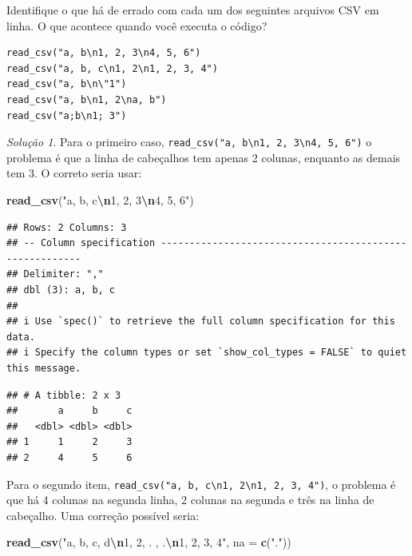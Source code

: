 \documentclass[
]{latex/krantz}
\newenvironment{Shaded}{\begin{snugshade}}{\end{snugshade}}
\newcommand{\AttributeTok}[1]{\textcolor[rgb]{0.13,0.29,0.53}{#1}}
\newcommand{\FunctionTok}[1]{\textcolor[rgb]{0.13,0.29,0.53}{\textbf{#1}}}
\newcommand{\NormalTok}[1]{#1}
\newcommand{\SpecialCharTok}[1]{\textcolor[rgb]{0.81,0.36,0.00}{\textbf{#1}}}
\newcommand{\StringTok}[1]{\textcolor[rgb]{0.31,0.60,0.02}{#1}}
\theoremstyle{definition}
\theoremstyle{definition}
\theoremstyle{definition}
\theoremstyle{definition}
\theoremstyle{remark}
\newtheorem*{solution}{Solução}
\begin{document}
Identifique o que há de errado com cada um dos seguintes arquivos CSV em linha. O que acontece quando você executa o código?

\begin{verbatim}
read_csv("a, b\n1, 2, 3\n4, 5, 6")
read_csv("a, b, c\n1, 2\n1, 2, 3, 4")
read_csv("a, b\n\"1")
read_csv("a, b\n1, 2\na, b")
read_csv("a;b\n1; 3")
\end{verbatim}

\begin{solution}

Para o primeiro caso, \texttt{read\_csv("a,\ b\textbackslash{}n1,\ 2,\ 3\textbackslash{}n4,\ 5,\ 6")} o problema é que a linha de cabeçalhos tem apenas 2 colunas, enquanto as demais tem 3. O correto seria usar:

\begin{Shaded}
\begin{Highlighting}[]
\FunctionTok{read\_csv}\NormalTok{(}\StringTok{"a, b, c}\SpecialCharTok{\textbackslash{}n}\StringTok{1, 2, 3}\SpecialCharTok{\textbackslash{}n}\StringTok{4, 5, 6"}\NormalTok{)}
\end{Highlighting}
\end{Shaded}

\begin{verbatim}
## Rows: 2 Columns: 3
## -- Column specification --------------------------------------------------------
## Delimiter: ","
## dbl (3): a, b, c
## 
## i Use `spec()` to retrieve the full column specification for this data.
## i Specify the column types or set `show_col_types = FALSE` to quiet this message.
\end{verbatim}

\begin{verbatim}
## # A tibble: 2 x 3
##       a     b     c
##   <dbl> <dbl> <dbl>
## 1     1     2     3
## 2     4     5     6
\end{verbatim}

Para o segundo item, \texttt{read\_csv("a,\ b,\ c\textbackslash{}n1,\ 2\textbackslash{}n1,\ 2,\ 3,\ 4")}, o problema é que há 4 colunas na segunda linha, 2 colunas na segunda e três na linha de cabeçalho. Uma correção possível seria:

\begin{Shaded}
\begin{Highlighting}[]
\FunctionTok{read\_csv}\NormalTok{(}\StringTok{"a, b, c, d}\SpecialCharTok{\textbackslash{}n}\StringTok{1, 2, . , .}\SpecialCharTok{\textbackslash{}n}\StringTok{1, 2, 3, 4"}\NormalTok{, }\AttributeTok{na =} \FunctionTok{c}\NormalTok{(}\StringTok{"."}\NormalTok{))}
\end{Highlighting}
\end{Shaded}


\end{solution}
\end{document}
